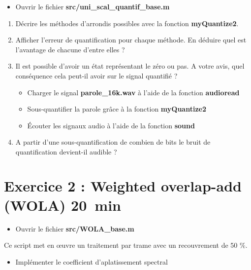 \documentclass{article}
\begin{document}
\begin{itemize}
	\item Ouvrir le fichier \textbf{src/uni\_scal\_quantif\_base.m}
\end{itemize}

\begin{enumerate}[label=\textbf{\arabic*})]
	\item Décrire les méthodes d'arrondis possibles avec la fonction \textbf{myQuantize2}.
	\item Afficher l'erreur de quantification pour chaque méthode. En déduire quel est l'avantage de chacune d'entre elles ?
	\item Il est possible d'avoir un état représentant le zéro ou pas. A votre avis, quel conséquence cela peut-il avoir sur le signal quantifié ?
	\begin{itemize}
		\item Charger le signal \textbf{parole\_16k.wav} à l'aide de la fonction \textbf{audioread}
		\item Sous-quantifier la parole grâce à la fonction \textbf{myQuantize2}
		\item Écouter les signaux audio à l'aide de la fonction \textbf{sound}
	\end{itemize}
	\item A partir d'une sous-quantification de combien de bits le bruit de quantification devient-il audible ?
\end{enumerate}

\section{Exercice 2 : Weighted overlap-add (WOLA) \small{20~min}}
\begin{itemize}
	\item Ouvrir le fichier \textbf{src/WOLA\_base.m}
\end{itemize}

Ce script met en \oe uvre un traitement par trame avec un recouvrement de 50 \%.
\begin{itemize}
	\item Implémenter le coefficient d'aplatissement spectral
\end{itemize}
\end{document}
